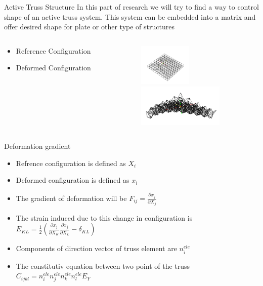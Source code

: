 \documentclass{beamer}
\begin{document}
\begin{frame}{Active Truss Structure }
In this part of research we will try to find a way to control shape of an active truss system. This system can be embedded into a matrix and offer desired shape for plate or other type of structures

     \begin{columns}[t] %
     \begin{column}[T]{5cm} %
       \begin{itemize} \itemsep10ex
  \item  Reference Configuration   \\
  \item  Deformed Configuration
  \end{itemize} 
     \end{column}
     \begin{column}[T]{5cm} %
      \includegraphics[height=2cm]{../images/Truss_3D_Shape_z_xy_deformation_Undeformed}\\
      \includegraphics[height=2cm]{../images/Truss_3D_Shape_z_xy_deformation_ZY_Plane}\\     
     \end{column}
     \end{columns}    
\end{frame}


\begin{frame}{Deformation gradient}
\begin{itemize}
\item  Refrence configuration is defined as $X_i$
\item  Deformed configuration is defined as $x_i$
\item  The gradient of deformation will be $F_{ij}=\frac{\partial
x_j}{\partial X_j}$
\item The strain induced due to this change in configuration is 
$E_{KL}=\frac{1}{2}\left( \frac{\partial x_j}{\partial X_K}\frac{\partial x_j}{\partial X_L}-\delta_{KL}\right)$ 
\item  Components of direction vector of truss element are $n^{ele}_i$
\item  The constitutiv equation between two point of the truss
$C_{ijkl}= n^{ele}_i n^{ele}_j n^{ele}_k  n^{ele}_l E_Y$
\end{itemize}      
\end{frame} 
\end{document}
